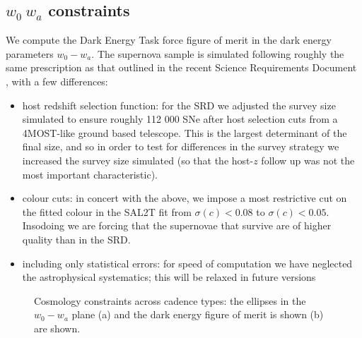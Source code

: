 \subsection{$w_0~w_a$ constraints}


We compute the Dark Energy Task force figure of merit in the dark energy parameters $w_0-w_a.$
The supernova sample is simulated following roughly the same prescription as that outlined in the recent Science Requirements Document \cite{descsrd}, with a few differences:
\begin{itemize}
\item host redshift selection function: for the SRD we adjusted the survey size simulated to ensure roughly 112 000 SNe after host selection cuts from a 4MOST-like ground based telescope. This is the largest determinant of the final size, and so in order to test for differences in the survey strategy we increased the survey size simulated (so that the host-$z$ follow up was not the most important characteristic).
\item colour cuts: in concert with the above, we impose a most restrictive cut on the fitted colour in the SAL2T fit from $\sigma(c) < 0.08$ to $\sigma(c) < 0.05.$ Insodoing we are forcing that the supernovae that survive are of higher quality than in the SRD.
\item including only statistical errors: for speed of computation we have neglected the astrophysical systematics; this will be relaxed in future versions
\end{itemize}





\begin{figure}
  \begin{center}
    \caption{Cosmology constraints across cadence types: the ellipses in the $w_0-w_a$ plane (a) and the dark energy figure of merit is shown (b) are shown.}
    \end{center}
\end{figure}

\begin{comment}
\begin{figure}
  \begin{center}
$\begin{array}{cc} 
    \texttt{[image: w0wa/FM\_plot\_cadence\_updated.png]} &
    \texttt{[image: w0wa/FoM\_cadence\_updated.png]}
\end{array}$
    \caption{Cosmology constraints across cadence types: the ellipses in the $w_0-w_a$ plane (left panel) and the dark energy figure of merit is shown (right panel) are shown. 
    \label{fig:snfom}}
  \end{center}
\end{figure}
\end{comment}

